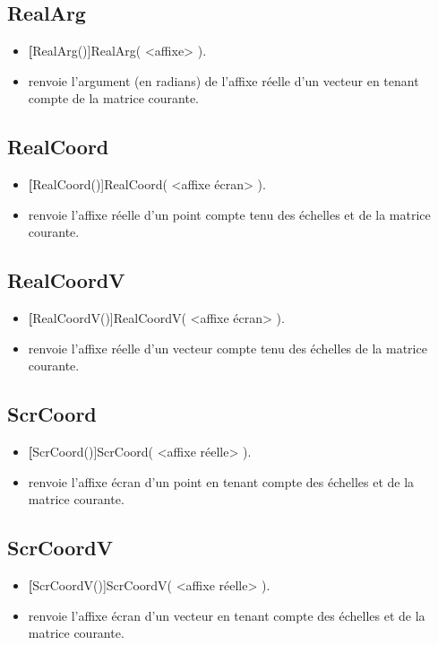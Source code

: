 \subsection{RealArg}
\begin{itemize}
 \item \util \textbf[RealArg()]{RealArg( <affixe> )}.
 \item \desc renvoie l'argument (en radians) de l'affixe réelle d'un vecteur en tenant compte de la matrice courante.
\end{itemize}


\subsection{RealCoord}
\begin{itemize}
 \item \util \textbf[RealCoord()]{RealCoord( <affixe écran> )}.
 \item \desc renvoie l'affixe réelle d'un point compte tenu des échelles et de la matrice courante.
\end{itemize}

\subsection{RealCoordV}
\begin{itemize}
 \item \util \textbf[RealCoordV()]{RealCoordV( <affixe écran> )}.
 \item \desc renvoie l'affixe réelle d'un vecteur compte tenu des échelles de la matrice courante.
\end{itemize}

\subsection{ScrCoord}
\begin{itemize}
 \item \util \textbf[ScrCoord()]{ScrCoord( <affixe réelle> )}.
 \item \desc renvoie l'affixe écran d'un point en tenant compte des échelles et de la matrice courante.
\end{itemize}

\subsection{ScrCoordV}
\begin{itemize}
 \item \util \textbf[ScrCoordV()]{ScrCoordV( <affixe réelle> )}.
 \item \desc renvoie l'affixe écran d'un vecteur en tenant compte des échelles et de la matrice courante.
\end{itemize}

